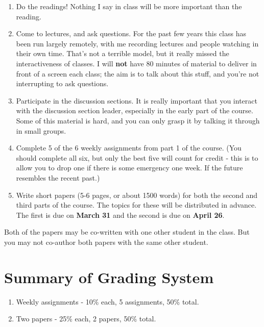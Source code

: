 \documentclass[
]{article}
\providecommand{\tightlist}{%
  \setlength{\itemsep}{0pt}\setlength{\parskip}{0pt}}
\begin{document}
\begin{enumerate}
\def\labelenumi{\arabic{enumi}.}
\tightlist
\item
  Do the readings! Nothing I say in class will be more important than
  the reading.
\item
  Come to lectures, and ask questions. For the past few years this class
  has been run largely remotely, with me recording lectures and people
  watching in their own time. That's not a terrible model, but it really
  missed the interactiveness of classes. I will \textbf{not} have 80
  minutes of material to deliver in front of a screen each class; the
  aim is to talk about this stuff, and you're not interrupting to ask
  questions.
\item
  Participate in the discussion sections. It is really important that
  you interact with the discussion section leader, especially in the
  early part of the course. Some of this material is hard, and you can
  only grasp it by talking it through in small groups.
\item
  Complete 5 of the 6 weekly assignments from part 1 of the course. (You
  should complete all six, but only the best five will count for credit
  - this is to allow you to drop one if there is some emergency one
  week. If the future resembles the recent past.)
\item
  Write short papers (5-6 pages, or about 1500 words) for both the
  second and third parts of the course. The topics for these will be
  distributed in advance. The first is due on \textbf{March 31} and the
  second is due on \textbf{April 26}.
\end{enumerate}

Both of the papers may be co-written with one other student in the
class. But you may not co-author both papers with the same other
student.

\hypertarget{summary-of-grading-system}{%
\section{Summary of Grading System}\label{summary-of-grading-system}}

\begin{enumerate}
\def\labelenumi{\arabic{enumi}.}
\tightlist
\item
  Weekly assignments - 10\% each, 5 assignments, 50\% total.
\item
  Two papers - 25\% each, 2 papers, 50\% total.
\end{enumerate}
\end{document}
